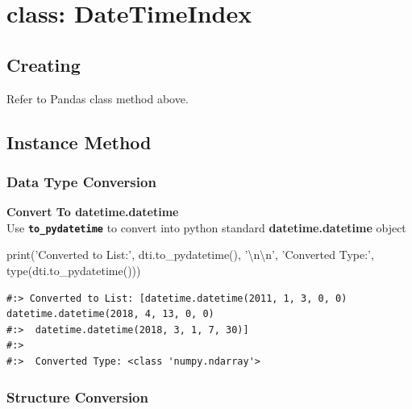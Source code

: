 \documentclass[
]{book}
\newenvironment{Shaded}{\begin{snugshade}}{\end{snugshade}}
\newcommand{\BuiltInTok}[1]{#1}
\newcommand{\CharTok}[1]{\textcolor[rgb]{0.5,0.5,0.5}{#1}}
\newcommand{\NormalTok}[1]{#1}
\newcommand{\StringTok}[1]{\textcolor[rgb]{0.5,0.5,0.5}{#1}}
\begin{document}
\hypertarget{class-datetimeindex}{%
\section{class: DateTimeIndex}\label{class-datetimeindex}}

\hypertarget{creating-1}{%
\subsection{Creating}\label{creating-1}}

Refer to Pandas class method above.

\hypertarget{instance-method-4}{%
\subsection{Instance Method}\label{instance-method-4}}

\hypertarget{data-type-conversion}{%
\subsubsection{Data Type Conversion}\label{data-type-conversion}}

\textbf{Convert To datetime.datetime}\\
Use \textbf{\texttt{to\_pydatetime}} to convert into python standard \textbf{datetime.datetime} object

\begin{Shaded}
\begin{Highlighting}[]
\BuiltInTok{print}\NormalTok{(}\StringTok{'Converted to List:'}\NormalTok{, dti.to_pydatetime(), }\StringTok{'}\CharTok{\textbackslash{}n\textbackslash{}n}\StringTok{'}\NormalTok{,}
      \StringTok{'Converted Type:'}\NormalTok{,    }\BuiltInTok{type}\NormalTok{(dti.to_pydatetime()))}
\end{Highlighting}
\end{Shaded}

\begin{verbatim}
#:> Converted to List: [datetime.datetime(2011, 1, 3, 0, 0) datetime.datetime(2018, 4, 13, 0, 0)
#:>  datetime.datetime(2018, 3, 1, 7, 30)] 
#:> 
#:>  Converted Type: <class 'numpy.ndarray'>
\end{verbatim}

\hypertarget{structure-conversion}{%
\subsubsection{Structure Conversion}\label{structure-conversion}}
\end{document}
